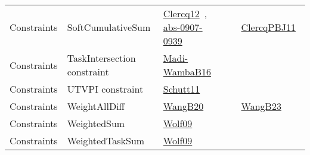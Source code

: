{\begin{longtable}{lp{3cm}>{\raggedright\arraybackslash}p{6cm}>{\raggedright\arraybackslash}p{6cm}>{\raggedright\arraybackslash}p{8cm}}
Constraints & SoftCumulativeSum & \href{../works/Clercq12.pdf}{Clercq12}~\cite{Clercq12}, \href{../works/abs-0907-0939.pdf}{abs-0907-0939}~\cite{abs-0907-0939} &  & \href{../works/ClercqPBJ11.pdf}{ClercqPBJ11}~\cite{ClercqPBJ11}\\
Constraints & TaskIntersection constraint & \href{../works/Madi-WambaB16.pdf}{Madi-WambaB16}~\cite{Madi-WambaB16} &  & \\
Constraints & UTVPI constraint & \href{../works/Schutt11.pdf}{Schutt11}~\cite{Schutt11} &  & \\
Constraints & WeightAllDiff & \href{../works/WangB20.pdf}{WangB20}~\cite{WangB20} &  & \href{../works/WangB23.pdf}{WangB23}~\cite{WangB23}\\
Constraints & WeightedSum & \href{../works/Wolf09.pdf}{Wolf09}~\cite{Wolf09} &  & \\
Constraints & WeightedTaskSum & \href{../works/Wolf09.pdf}{Wolf09}~\cite{Wolf09} &  & \\

\end{longtable}}
